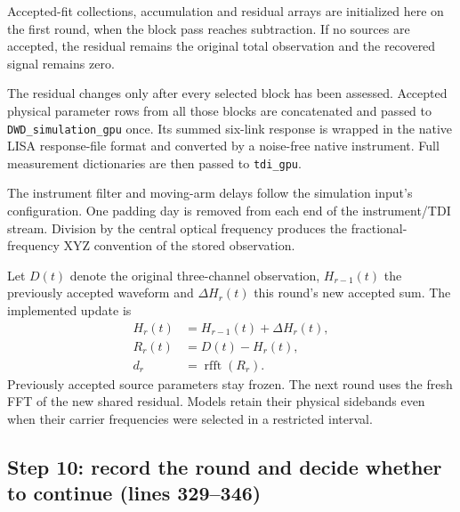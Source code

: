 \documentclass[11pt,a4paper]{article}
\newcommand{\code}[1]{\texttt{\nolinkurl{#1}}}
\begin{document}
Accepted-fit collections, accumulation and residual arrays are initialized
here on the first round, when the block pass reaches subtraction.
If no sources are accepted, the residual remains the original total observation
and the recovered signal remains zero.

The residual changes only after every selected block has been assessed.
Accepted physical parameter rows from all those blocks are concatenated and
passed to \code{DWD_simulation_gpu} once. Its summed six-link response is wrapped
in the native LISA response-file format and converted by a noise-free native
instrument. Full measurement dictionaries are then passed to \code{tdi_gpu}.

The instrument filter and moving-arm delays follow the simulation input's
configuration. One padding day is removed from each end of the instrument/TDI
stream. Division by the central optical frequency produces the fractional-
frequency XYZ convention of the stored observation.

Let \(D(t)\) denote the original three-channel observation, \(H_{r-1}(t)\) the
previously accepted waveform and \(\Delta H_r(t)\) this round's new accepted sum.
The implemented update is
\begin{align}
H_r(t)&=H_{r-1}(t)+\Delta H_r(t),\\
R_r(t)&=D(t)-H_r(t),\\
d_r&=\operatorname{rfft}(R_r).
\end{align}
Previously accepted source parameters stay frozen. The next round uses the
fresh FFT of the new shared residual. Models retain their physical sidebands
even when their carrier frequencies were selected in a restricted interval.

\subsection{Step 10: record the round and decide whether to continue (lines 329--346)}
\end{document}
